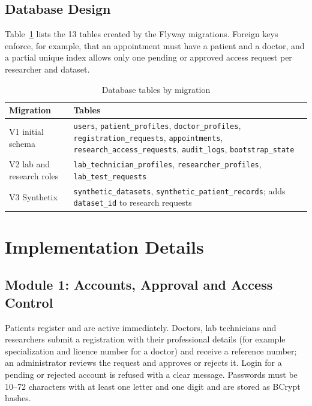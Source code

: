 \documentclass{tietreport}
\begin{document}
\subsection{Database Design}

Table~\ref{tab:tables} lists the 13 tables created by the Flyway migrations.
Foreign keys enforce, for example, that an appointment must have a patient
and a doctor, and a partial unique index allows only one pending or approved
access request per researcher and dataset.

\begin{table}[H]
\centering
\small
\begin{tabular}{p{3.2cm}p{9.6cm}}
\toprule
\textbf{Migration} & \textbf{Tables} \\
\midrule
V1 initial schema & \texttt{users}, \texttt{patient\_profiles}, \texttt{doctor\_profiles}, \texttt{registration\_requests}, \texttt{appointments}, \texttt{research\_access\_requests}, \texttt{audit\_logs}, \texttt{bootstrap\_state} \\
V2 lab and research roles & \texttt{lab\_technician\_profiles}, \texttt{researcher\_profiles}, \texttt{lab\_test\_requests} \\
V3 Synthetix & \texttt{synthetic\_datasets}, \texttt{synthetic\_patient\_records}; adds \texttt{dataset\_id} to research requests \\
\bottomrule
\end{tabular}
\caption{Database tables by migration}
\label{tab:tables}
\end{table}

\section{Implementation Details}

\subsection{Module 1: Accounts, Approval and Access Control}

Patients register and are active immediately. Doctors, lab technicians and
researchers submit a registration with their professional details (for
example specialization and licence number for a doctor) and receive a
reference number; an administrator reviews the request and approves or
rejects it. Login for a pending or rejected account is refused with a clear
message. Passwords must be 10--72 characters with at least one letter and one
digit and are stored as BCrypt hashes.
\end{document}
